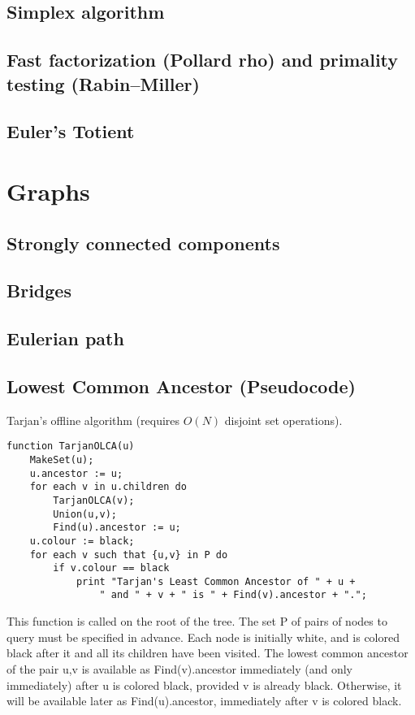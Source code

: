 \documentclass[9pt]{extarticle}
\begin{document}
\begin{multicols*}{3}
\subsection{Simplex algorithm} %


\subsection{Fast factorization (Pollard rho) and primality testing
(Rabin--Miller)} %


\subsection{Euler's Totient} %


\section{Graphs}

\subsection{Strongly connected components} %


\subsection{Bridges} %


\subsection{Eulerian path} %


\subsection{Lowest Common Ancestor (Pseudocode)} %
Tarjan's offline algorithm (requires $O(N)$ disjoint set operations).
\begin{lstlisting}
function TarjanOLCA(u)
    MakeSet(u);
    u.ancestor := u;
    for each v in u.children do
        TarjanOLCA(v);
        Union(u,v);
        Find(u).ancestor := u;
    u.colour := black;
    for each v such that {u,v} in P do
        if v.colour == black
            print "Tarjan's Least Common Ancestor of " + u +
                " and " + v + " is " + Find(v).ancestor + ".";
\end{lstlisting}
This function is called on the root of the tree. The set P of pairs of nodes to
query must be specified in advance. Each node is initially white, and is
colored black after it and all its children have been visited. The lowest
common ancestor of the pair {u,v} is available as Find(v).ancestor immediately
(and only immediately) after u is colored black, provided v is already black.
Otherwise, it will be available later as Find(u).ancestor, immediately after v
is colored black.


\end{multicols*}
\end{document}
